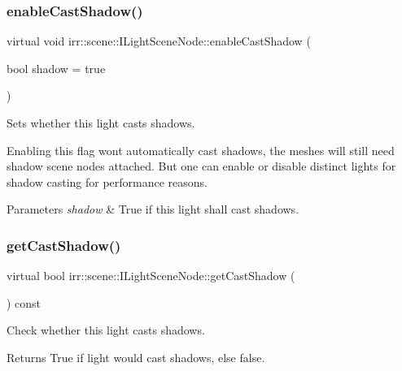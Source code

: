 \subsubsection{\texorpdfstring{enable\+Cast\+Shadow()}{enableCastShadow()}\hspace{0.1cm}{\footnotesize\ttfamily [2/2]}}
{\footnotesize\ttfamily virtual void irr\+::scene\+::\+I\+Light\+Scene\+Node\+::enable\+Cast\+Shadow (\begin{DoxyParamCaption}\item[{bool}]{shadow = {\ttfamily true} }\end{DoxyParamCaption})\hspace{0.3cm}{\ttfamily [pure virtual]}}



Sets whether this light casts shadows. 

Enabling this flag won\textquotesingle{}t automatically cast shadows, the meshes will still need shadow scene nodes attached. But one can enable or disable distinct lights for shadow casting for performance reasons. 
\begin{DoxyParams}{Parameters}
{\em shadow} & True if this light shall cast shadows. \\
\hline
\end{DoxyParams}
\mbox{\label{classirr_1_1scene_1_1ILightSceneNode_a5ba3a03fc0cfbad7dd8ce2f338a1991a}} 
\subsubsection{\texorpdfstring{get\+Cast\+Shadow()}{getCastShadow()}\hspace{0.1cm}{\footnotesize\ttfamily [1/2]}}
{\footnotesize\ttfamily virtual bool irr\+::scene\+::\+I\+Light\+Scene\+Node\+::get\+Cast\+Shadow (\begin{DoxyParamCaption}{ }\end{DoxyParamCaption}) const\hspace{0.3cm}{\ttfamily [pure virtual]}}



Check whether this light casts shadows. 

\begin{DoxyReturn}{Returns}
True if light would cast shadows, else false. 
\end{DoxyReturn}
\mbox{\label{classirr_1_1scene_1_1ILightSceneNode_a5ba3a03fc0cfbad7dd8ce2f338a1991a}} 
